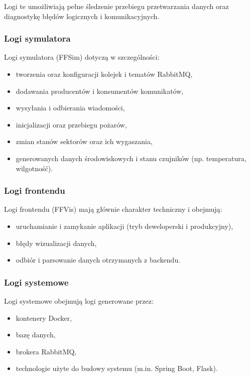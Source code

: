 \documentclass[11pt,a4paper]{article}
\begin{document}
Logi te umożliwiają pełne śledzenie przebiegu przetwarzania danych oraz diagnostykę błędów logicznych i komunikacyjnych.

\subsubsection*{Logi symulatora}

Logi symulatora (FFSim) dotyczą w szczególności:
\begin{itemize}
    \item tworzenia oraz konfiguracji kolejek i tematów RabbitMQ,
    \item dodawania producentów i konsumentów komunikatów,
    \item wysyłania i odbierania wiadomości,
    \item inicjalizacji oraz przebiegu pożarów,
    \item zmian stanów sektorów oraz ich wygaszania,
    \item generowanych danych środowiskowych i stanu czujników (np. temperatura, wilgotność).
\end{itemize}

\subsubsection*{Logi frontendu}

Logi frontendu (FFVis) mają głównie charakter techniczny i obejmują:
\begin{itemize}
    \item uruchamianie i zamykanie aplikacji (tryb deweloperski i produkcyjny),
    \item błędy wizualizacji danych,
    \item odbiór i parsowanie danych otrzymanych z backendu.
\end{itemize}

\subsubsection*{Logi systemowe}

Logi systemowe obejmują logi generowane przez:
\begin{itemize}
    \item kontenery Docker,
    \item bazę danych,
    \item brokera RabbitMQ,
    \item technologie użyte do budowy systemu (m.in. Spring Boot, Flask).
\end{itemize}
\end{document}
